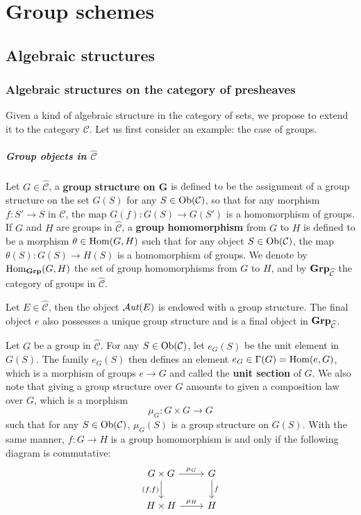 \chapter{Group schemes}
\section{Algebraic structures}
\subsection{Algebraic structures on the category of presheaves}
Given a kind of algebraic structure in the category of sets, we propose to extend it to the category $\mathcal{C}$. Let us first consider an example: the case of groups.
\paragraph{Group objects in \texorpdfstring{$\widehat{\mathcal{C}}$}{C}}
Let $G\in\widehat{\mathcal{C}}$, a \textbf{group structure on $\bm{G}$} is defined to be the assignment of a group structure on the set $G(S)$ for any $S\in\mathrm{Ob}(\mathcal{C})$, so that for any morphism $f:S'\to S$ in $\mathcal{C}$, the map $G(f):G(S)\to G(S')$ is a homomorphism of groups. If $G$ and $H$ are groups in $\widehat{\mathcal{C}}$, a \textbf{group homomorphism} from $G$ to $H$ is defined to be a morphism $\theta\in\mathrm{Hom}(G,H)$ such that for any object $S\in\mathrm{Ob}(\mathcal{C})$, the map $\theta(S):G(S)\to H(S)$ is a homomorphism of groups. We denote by $\mathrm{Hom}_{\mathbf{Grp}}(G,H)$ the set of group homomorphisms from $G$ to $H$, and by $\mathbf{Grp}_{\widehat{\mathcal{C}}}$ the category of groups in $\widehat{\mathcal{C}}$.

\begin{example}
Let $E\in\widehat{\mathcal{C}}$, then the object $\operatorname{\mathcal{A}\hspace*{-0.2pt}\textit{ut}\hspace{0.5pt}}(E)$ is endowed with a group structure. The final object $e$ also possesses a unique group structure and is a final object in $\mathbf{Grp}_{\widehat{\mathcal{C}}}$.
\end{example}

Let $G$ be a group in $\widehat{\mathcal{C}}$. For any $S\in\mathrm{Ob}(\mathcal{C})$, let $e_G(S)$ be the unit element in $G(S)$. The family $e_G(S)$ then defines an element $e_G\in\Gamma(G)=\mathrm{Hom}(e,G)$, which is a morphism of groups $e\to G$ and called the \textbf{unit section} of $G$. We also note that giving a group structure over $G$ amounts to given a composition law over $G$, which is a morphism
\[\mu_G:G\times G\to G\]
such that for any $S\in\mathrm{Ob}(\mathcal{C})$, $\mu_G(S)$ is a group structure on $G(S)$. With the same manner, $f:G\to H$ is a group homomorphism is and only if the following diagram is commutative:
\[\begin{tikzcd}
G\times G\ar[r,"\mu_G"]\ar[d,swap,"{(f,f)}"]&G\ar[d,"f"]\\
H\times H\ar[r,"\mu_H"]&H
\end{tikzcd}\]

